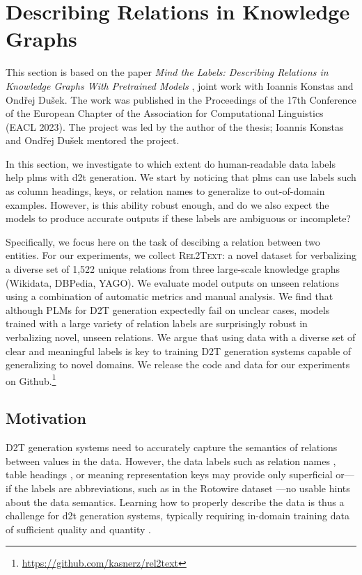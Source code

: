\section{Describing Relations in Knowledge Graphs}
\label{sec:rel2text}
\begin{refbox}
    This section is based on the paper \emph{Mind the Labels: Describing Relations in Knowledge Graphs With Pretrained Models} \cite{kasnerMindLabelsDescribing2022}, joint work with Ioannis Konstas and Ondřej Dušek. The work was published in the Proceedings of the 17th Conference of the European Chapter of the Association for Computational Linguistics (EACL 2023). The project was led by the author of the thesis; Ioannis Konstas and Ondřej Dušek mentored the project.
\end{refbox}
In this section, we investigate to which extent do human-readable data labels help \acp{plm} with \ac{d2t} generation. We start by noticing that \acp{plm} can use labels such as column headings, keys, or relation names to generalize to out-of-domain examples. However, is this ability robust enough, and do we also expect the models to produce accurate outputs if these labels are ambiguous or incomplete?

Specifically, we focus here on the task of descibing a relation between two entities. For our experiments, we collect \textsc{Rel2Text}: a novel dataset for verbalizing a diverse set of 1,522 unique relations from three large-scale knowledge graphs (Wikidata, DBPedia, YAGO). We evaluate model outputs on unseen relations using a combination of automatic metrics and manual analysis. We find that although PLMs for D2T generation expectedly fail on unclear cases, models trained with a large variety of relation labels are surprisingly robust in verbalizing novel, unseen relations. We argue that using data with a diverse set of clear and meaningful labels is key to training D2T generation systems capable of generalizing to novel domains. We release the code and data for our experiments on Github.\footnote{\url{https://github.com/kasnerz/rel2text}}


% 

\subsection{Motivation}
D2T generation systems need to accurately capture the semantics of relations between values in the data. However, the data labels such as relation names \cite{farber2018linked,haller2022analysis}, table headings \cite{parikhToTToControlledTableToText2020}, or meaning representation keys \cite{dusekEvaluatingStateoftheartEndtoEnd2020} may provide only superficial or---if the labels are abbreviations, such as in the Rotowire dataset \cite{wiseman2017challenges}---no usable hints about the data semantics. Learning how to properly describe the data is thus a challenge for \ac{d2t} generation systems, typically requiring in-domain training data of sufficient quality and quantity \cite{dusekSemanticNoiseMatters2019}.

